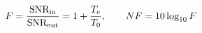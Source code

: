 \documentclass[preview]{standalone}
\begin{document}
\begin{align*}
\special{dvisvgm:raw <g id='unique000'>}F = \frac{\text{SNR}_{\rm in}}{\text{SNR}_{\rm out}}= 1 + \frac{T_e}{T_0},\qquad NF = 10\log_{10} F\special{dvisvgm:raw </g>}
\end{align*}
\end{document}
